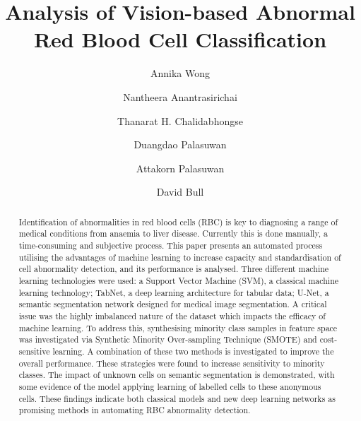 \documentclass[final,5p,times,twocolumn,authoryear]{elsarticle}
\begin{document}
\begin{frontmatter}


\title{Analysis of Vision-based Abnormal Red Blood Cell Classification}

\author[label1]{Annika Wong}
\author[label1]{Nantheera Anantrasirichai}
\author[label2]{Thanarat H. Chalidabhongse}
\author[label3]{Duangdao Palasuwan}
\author[label4]{Attakorn Palasuwan}
\author[label1]{David Bull}

             
             
             

\begin{abstract}
Identification of abnormalities in red blood cells (RBC) is key to diagnosing a range of medical conditions from anaemia to liver disease. Currently this is done manually, a time-consuming and subjective process. This paper presents an automated process utilising the advantages of machine learning to increase capacity and standardisation of cell abnormality detection, and its performance is analysed. Three different machine learning technologies were used: a Support Vector Machine (SVM), a classical machine learning technology; TabNet, a deep learning architecture for tabular data; U-Net, a semantic segmentation network designed for medical image segmentation. A critical issue was the highly imbalanced nature of the dataset which impacts the efficacy of machine learning. To address this, synthesising minority class samples in feature space was investigated via  Synthetic Minority Over-sampling Technique (SMOTE) and cost-sensitive learning. A combination of these two methods is investigated to improve the overall performance. These strategies were found to increase sensitivity to minority classes. The impact of unknown cells on semantic segmentation is demonstrated, with some evidence of the model applying learning of labelled cells to these anonymous cells. These findings indicate both classical models and new deep learning networks as promising methods in automating RBC abnormality detection.


\end{abstract}
\end{frontmatter}
\end{document}
